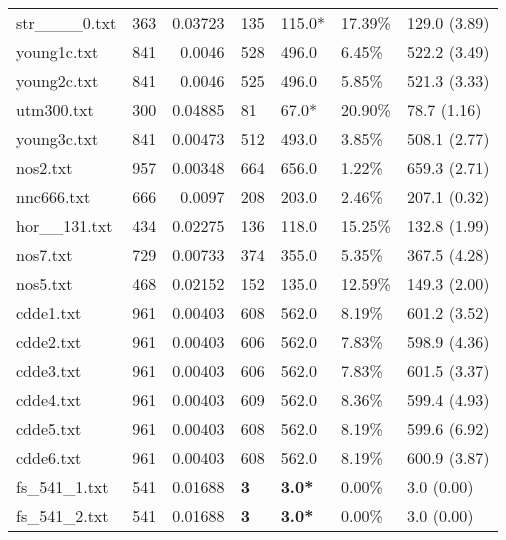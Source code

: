 \begin{table}[h]
\begin{tabular}{lrrllll}
 str____0.txt       &     363 &     0.03723 & 135          & 115.0*          & 17.39\%  & 129.0 (3.89)   \\
 young1c.txt        &     841 &     0.0046  & 528          & 496.0           & 6.45\%   & 522.2 (3.49)   \\
 young2c.txt        &     841 &     0.0046  & 525          & 496.0           & 5.85\%   & 521.3 (3.33)   \\
 utm300.txt         &     300 &     0.04885 & 81           & 67.0*           & 20.90\%  & 78.7 (1.16)    \\
 young3c.txt        &     841 &     0.00473 & 512          & 493.0           & 3.85\%   & 508.1 (2.77)   \\
 nos2.txt           &     957 &     0.00348 & 664          & 656.0           & 1.22\%   & 659.3 (2.71)   \\
 nnc666.txt         &     666 &     0.0097  & 208          & 203.0           & 2.46\%   & 207.1 (0.32)   \\
 hor__131.txt       &     434 &     0.02275 & 136          & 118.0           & 15.25\%  & 132.8 (1.99)   \\
 nos7.txt           &     729 &     0.00733 & 374          & 355.0           & 5.35\%   & 367.5 (4.28)   \\
 nos5.txt           &     468 &     0.02152 & 152          & 135.0           & 12.59\%  & 149.3 (2.00)   \\
 cdde1.txt          &     961 &     0.00403 & 608          & 562.0           & 8.19\%   & 601.2 (3.52)   \\
 cdde2.txt          &     961 &     0.00403 & 606          & 562.0           & 7.83\%   & 598.9 (4.36)   \\
 cdde3.txt          &     961 &     0.00403 & 606          & 562.0           & 7.83\%   & 601.5 (3.37)   \\
 cdde4.txt          &     961 &     0.00403 & 609          & 562.0           & 8.36\%   & 599.4 (4.93)   \\
 cdde5.txt          &     961 &     0.00403 & 608          & 562.0           & 8.19\%   & 599.6 (6.92)   \\
 cdde6.txt          &     961 &     0.00403 & 608          & 562.0           & 8.19\%   & 600.9 (3.87)   \\
 fs_541_1.txt       &     541 &     0.01688 & \textbf{3}   & \textbf{3.0*}   & 0.00\%   & 3.0 (0.00)     \\
 fs_541_2.txt       &     541 &     0.01688 & \textbf{3}   & \textbf{3.0*}   & 0.00\%   & 3.0 (0.00)     \\

\end{tabular}
\end{table}
